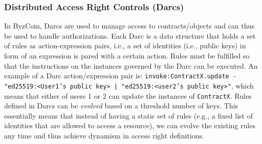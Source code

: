 






\subsubsection{Distributed Access Right Controls (Darcs)}\label{background:darc}


In ByzCoin, Darcs are used to manage access to contracts/objects and can thus be used to handle authorizations. Each Darc is a data structure that holds a set of rules as action-expression pairs, i.e., a set of identities (i.e., public keys) in form of an expression is pared with a certain action. Rules must be fulfilled so that the instructions on the instances governed by the Darc can be executed. An example of a Darc action/expression pair is: \texttt{invoke:ContractX.update - "ed25519:<User1's public key> | "ed25519:<user2's public key>"}, which means that either of users 1 or 2 can update the instances of \texttt{ContractX}. Rules defined in Darcs can be \textit{evolved} based on a threshold number of keys. This essentially means that instead of having a static set of rules (e.g., a fixed list of identities that are allowed to access a resource), we can evolve the existing rules any time and thus achieve dynamism in access right definitions.  

